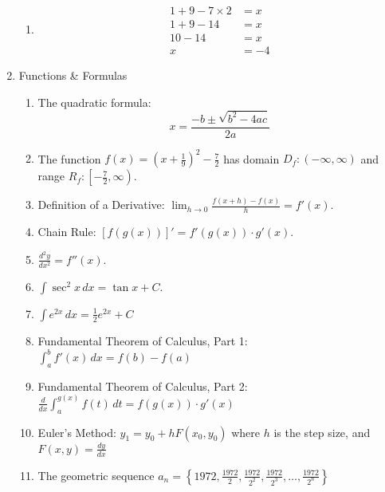 \documentclass[12pt]{article}
\begin{document}
\begin{enumerate}
\begin{enumerate}
        \item
        \begin{align}
            1 + 9 - 7 \times 2 &= x \tag{1}\\
            1 + 9 - 14 &= x \tag{2}\\
            10 - 14 &= x \tag{3}\\
            x &= -4 \tag{4}
        \end{align}
    \end{enumerate}

    \item Functions \& Formulas
    \begin{enumerate}
        \item The quadratic formula: \[x = \frac{-b \pm \sqrt{b^2 - 4ac}}{2a}\]
        
        \item The function \( f(x) = \left( x + \frac{1}{9} \right)^2 - \frac{7}{2} \) has domain \( D_f : (-\infty, \infty) \) and range \( R_f : \left[ -\frac{7}{2}, \infty \right) \).
        
        \item Definition of a Derivative: \( \lim_{h \to 0} \frac{f(x+h) - f(x)}{h} = f'(x) \).

        \item Chain Rule: \( [f(g(x))]' = f'(g(x)) \cdot g'(x) \).

        \item \(\frac{d^2 y}{dx^2} = f''(x) \).
        
        \item \(\int \sec^2 x \, dx = \tan x + C\).

        \item $\int e^{2x} \, dx = \frac{1}{2}e^{2x} + C$
        
        \item Fundamental Theorem of Calculus, Part 1: $\int_a^b f'(x) \, dx = f(b) - f(a)$
        
        \item Fundamental Theorem of Calculus, Part 2: $\frac{d}{dx} \int_a^{g(x)} f(t) \, dt = f(g(x)) \cdot g'(x)$
        
        \item Euler’s Method: $y_1 = y_0 + hF(x_0, y_0) $ where $h$ is the step size, and $F(x, y) = \frac{dy}{dx}$
        
        \item The geometric sequence $a_n = \left\{1972, \frac{1972}{2}, \frac{1972}{2^2}, \frac{1972}{2^3}, \dots, \frac{1972}{2^n} \right\}$
        

\end{enumerate}
\end{enumerate}
\end{document}
